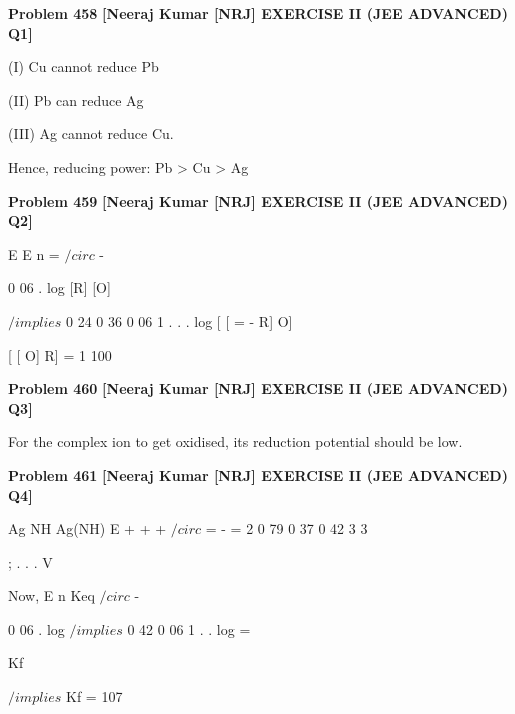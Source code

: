 \begin{problembox}
\textbf{Problem 458} \hfill \textbf{[Neeraj Kumar [NRJ] EXERCISE II (JEE ADVANCED) Q1]}
\label{q:ext-nrj_all_questions-458}

(I) Cu cannot reduce Pb
 
 (II) Pb can reduce Ag
 
 (III) Ag cannot reduce Cu.
 
 Hence, reducing power: Pb > Cu > Ag
\end{problembox}

\begin{problembox}
\textbf{Problem 459} \hfill \textbf{[Neeraj Kumar [NRJ] EXERCISE II (JEE ADVANCED) Q2]}
\label{q:ext-nrj_all_questions-459}

E
E
n
=
$/circ$ -
 
0 06
.
log [R]
[O]
 
 $/implies$ 0 24
0 36
0 06
1
.
.
.
log [
[
=
-
R]
O]
 
   [
[
O]
R] = 1
100
\end{problembox}

\begin{problembox}
\textbf{Problem 460} \hfill \textbf{[Neeraj Kumar [NRJ] EXERCISE II (JEE ADVANCED) Q3]}
\label{q:ext-nrj_all_questions-460}

For the complex ion to get oxidised, its reduction 
potential should be low.
\end{problembox}

\begin{problembox}
\textbf{Problem 461} \hfill \textbf{[Neeraj Kumar [NRJ] EXERCISE II (JEE ADVANCED) Q4]}
\label{q:ext-nrj_all_questions-461}

Ag
NH
Ag(NH)
E
+
+
+
$/circ$ =
-
=
2
0 79
0 37
0 42
3
3

  


 



;
.
.
.
V
 
 Now, E
n
Keq
$/circ$ -
 
0 06
.
log
 $/implies$ 0 42
0 06
1
.
.
log
=
 
Kf 
 
 $/implies$ Kf = 107
\end{problembox}

